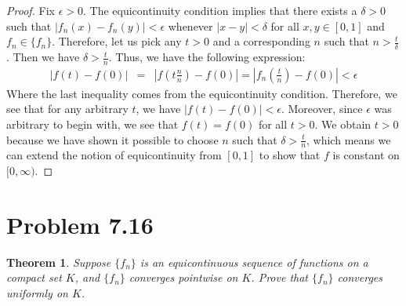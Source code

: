 \documentclass[psamsfonts]{amsart}
\newtheorem{thm}{Theorem}[section]
\theoremstyle{definition}
\theoremstyle{remark}
\numberwithin{equation}{section}
\begin{document}
\begin{proof}
Fix $\epsilon > 0$. The equicontinuity condition implies that there exists a $\delta > 0$ such that $|f_n(x) - f_n(y)| < \epsilon$ whenever $|x - y| < \delta$ for all $x,y \in [0,1]$ and $f_n \in \{ f_n \}$. Therefore, let us pick any $t > 0$ and a corresponding $n$ such that $n > \frac{t}{\delta}$. Then we have $\delta > \frac{t}{n}$. Thus, we have the following expression:
\begin{eqnarray}
|f(t) - f(0)| &=& \left|f \left(t \frac{n}{n} \right) - f(0)\right| = \left| f_n \left(\frac{t}{n} \right) - f(0) \right| < \epsilon
\end{eqnarray}
Where the last inequality comes from the equicontinuity condition. Therefore, we see that for any arbitrary $t$, we have $|f(t) - f(0)| < \epsilon$. Moreover, since $\epsilon$ was arbitrary to begin with, we see that $f(t) = f(0)$ for all $t > 0$. We obtain $t>0$ because we have shown it possible to choose $n$ such that $\delta > \frac{t}{n}$, which means we can extend the notion of equicontinuity from $[0,1]$ to show that $f$ is constant on $[0,\infty)$.
\end{proof}

\section{Problem 7.16}

\begin{thm}
Suppose $\{ f_n \}$ is an equicontinuous sequence of functions on a compact set $K$, and $\{ f_n \}$ converges pointwise on $K$. Prove that $\{ f_n \}$ converges uniformly on $K$. 
\end{thm}
\end{document}
